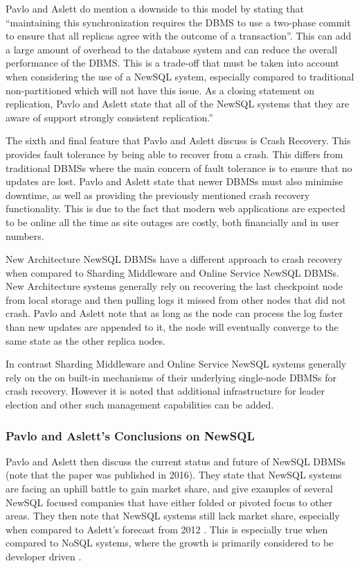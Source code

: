 \documentclass[10pt, conference]{IEEEtran}
\begin{document}
Pavlo and Aslett do mention a downside to this model by stating that ``maintaining this synchronization requires the DBMS to use a two-phase commit to ensure that all replicas agree with the outcome of a transaction''. This can add a large amount of overhead to the database system and can reduce the overall performance of the DBMS. This is a trade-off that must be taken into account when considering the use of a NewSQL system, especially compared to traditional non-partitioned which will not have this issue. As a closing statement on replication, Pavlo and Aslett state that all of the NewSQL systems that they are aware of support strongly consistent replication.''

The sixth and final feature that Pavlo and Aslett discuss is Crash Recovery. This provides fault tolerance by being able to recover from a crash. This differs from traditional DBMSs where the main concern of fault tolerance is to ensure that no updates are lost. Pavlo and Aslett state that newer DBMSs must also minimise downtime, as well as providing the previously mentioned crash recovery functionality. This is due to the fact that modern web applications are expected to be online all the time as site outages are costly, both financially and in user numbers. 

New Architecture NewSQL DBMSs have a different approach to crash recovery when compared to Sharding Middleware and Online Service NewSQL DBMSs. New Architecture systems generally rely on recovering the last checkpoint node from local storage and then pulling logs it missed from other nodes that did not crash. Pavlo and Aslett note that as long as the node can process the log faster than new updates are appended to it, the node will eventually converge to the same state as the other replica nodes. 

In contrast Sharding Middleware and Online Service NewSQL systems generally rely on the on built-in mechanisms of their underlying single-node DBMSs for crash recovery. However it is noted that additional infrastructure for leader election and other such management capabilities can be added.
 
\subsubsection{Pavlo and Aslett's Conclusions on NewSQL}
Pavlo and Aslett then discuss the current status and future of NewSQL DBMSs (note that the paper was published in 2016). They state that NewSQL systems are facing an uphill battle to gain market share, and give examples of several NewSQL focused companies that have either folded or pivoted focus to other areas. They then note that NewSQL systems still lack market share, especially when compared to Aslett's forecast from 2012 \cite{forecast}. This is especially true when compared to NoSQL systems, where the growth is primarily considered to be developer driven \cite{forecast}.
\end{document}
